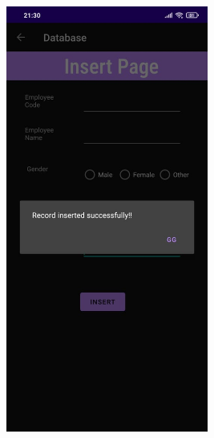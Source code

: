 \documentclass[12pt,letterpaper]{article}
\begin{document}
\begin{figure}
    \centering
    \includegraphics[height=14cm, keepaspectratio]{Outputs/OP5.jpeg}
\end{figure}

\newpage
\end{document}
